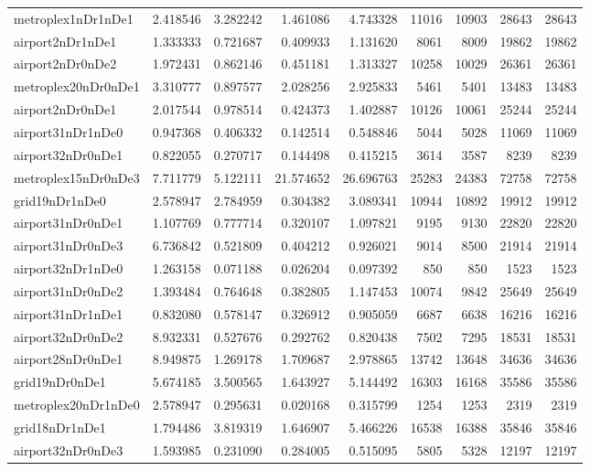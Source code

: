 \begin{longtable}{|l|r|r|r|r|r|r|r|r|}
metroplex1nDr1nDe1 & 2.418546 & 3.282242 & 1.461086 & 4.743328 & 11016 & 10903 & 28643 & 28643 \\
airport2nDr1nDe1 & 1.333333 & 0.721687 & 0.409933 & 1.131620 & 8061 & 8009 & 19862 & 19862 \\
airport2nDr0nDe2 & 1.972431 & 0.862146 & 0.451181 & 1.313327 & 10258 & 10029 & 26361 & 26361 \\
metroplex20nDr0nDe1 & 3.310777 & 0.897577 & 2.028256 & 2.925833 & 5461 & 5401 & 13483 & 13483 \\
airport2nDr0nDe1 & 2.017544 & 0.978514 & 0.424373 & 1.402887 & 10126 & 10061 & 25244 & 25244 \\
airport31nDr1nDe0 & 0.947368 & 0.406332 & 0.142514 & 0.548846 & 5044 & 5028 & 11069 & 11069 \\
airport32nDr0nDe1 & 0.822055 & 0.270717 & 0.144498 & 0.415215 & 3614 & 3587 & 8239 & 8239 \\
metroplex15nDr0nDe3 & 7.711779 & 5.122111 & 21.574652 & 26.696763 & 25283 & 24383 & 72758 & 72758 \\
grid19nDr1nDe0 & 2.578947 & 2.784959 & 0.304382 & 3.089341 & 10944 & 10892 & 19912 & 19912 \\
airport31nDr0nDe1 & 1.107769 & 0.777714 & 0.320107 & 1.097821 & 9195 & 9130 & 22820 & 22820 \\
airport31nDr0nDe3 & 6.736842 & 0.521809 & 0.404212 & 0.926021 & 9014 & 8500 & 21914 & 21914 \\
airport32nDr1nDe0 & 1.263158 & 0.071188 & 0.026204 & 0.097392 & 850 & 850 & 1523 & 1523 \\
airport31nDr0nDe2 & 1.393484 & 0.764648 & 0.382805 & 1.147453 & 10074 & 9842 & 25649 & 25649 \\
airport31nDr1nDe1 & 0.832080 & 0.578147 & 0.326912 & 0.905059 & 6687 & 6638 & 16216 & 16216 \\
airport32nDr0nDe2 & 8.932331 & 0.527676 & 0.292762 & 0.820438 & 7502 & 7295 & 18531 & 18531 \\
airport28nDr0nDe1 & 8.949875 & 1.269178 & 1.709687 & 2.978865 & 13742 & 13648 & 34636 & 34636 \\
grid19nDr0nDe1 & 5.674185 & 3.500565 & 1.643927 & 5.144492 & 16303 & 16168 & 35586 & 35586 \\
metroplex20nDr1nDe0 & 2.578947 & 0.295631 & 0.020168 & 0.315799 & 1254 & 1253 & 2319 & 2319 \\
grid18nDr1nDe1 & 1.794486 & 3.819319 & 1.646907 & 5.466226 & 16538 & 16388 & 35846 & 35846 \\
airport32nDr0nDe3 & 1.593985 & 0.231090 & 0.284005 & 0.515095 & 5805 & 5328 & 12197 & 12197 \\

\end{longtable}

